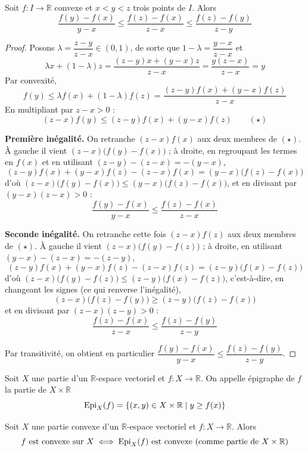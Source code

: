 \begin{prop}
Soit $f:I\to\mathbb{R}$ convexe et $x<y<z$ trois points de $I$. Alors
\[\frac{f(y)-f(x)}{y-x} \leq \frac{f(z)-f(x)}{z-x} \leq \frac{f(z)-f(y)}{z-y}\]
\end{prop}

\begin{proof}
Posons $\lambda = \dfrac{z-y}{z-x}\in(0,1)$, de sorte que $1-\lambda = \dfrac{y-x}{z-x}$ et
\[\lambda x+(1-\lambda)z = \frac{(z-y)x+(y-x)z}{z-x} = \frac{y(z-x)}{z-x} = y\]
Par convexité,
\[f(y) \leq \lambda f(x) + (1-\lambda) f(z) = \frac{(z-y)f(x)+(y-x)f(z)}{z-x}\]
En multipliant par $z-x>0$ :
\[(z-x)f(y) \leq (z-y)f(x)+(y-x)f(z) \qquad (\star)\]

\textbf{Première inégalité.} On retranche $(z-x)f(x)$ aux deux membres de $(\star)$. À gauche il vient $(z-x)\big(f(y)-f(x)\big)$ ; à droite, en regroupant les termes en $f(x)$ et en utilisant $(z-y)-(z-x)=-(y-x)$,
\[(z-y)f(x)+(y-x)f(z)-(z-x)f(x) = (y-x)\big(f(z)-f(x)\big)\]
d'où $(z-x)\big(f(y)-f(x)\big) \leq (y-x)\big(f(z)-f(x)\big)$, et en divisant par $(y-x)(z-x)>0$ :
\[\frac{f(y)-f(x)}{y-x} \leq \frac{f(z)-f(x)}{z-x}\]

\textbf{Seconde inégalité.} On retranche cette fois $(z-x)f(z)$ aux deux membres de $(\star)$. À gauche il vient $(z-x)\big(f(y)-f(z)\big)$ ; à droite, en utilisant $(y-x)-(z-x)=-(z-y)$,
\[(z-y)f(x)+(y-x)f(z)-(z-x)f(z) = (z-y)\big(f(x)-f(z)\big)\]
d'où $(z-x)\big(f(y)-f(z)\big) \leq (z-y)\big(f(x)-f(z)\big)$, c'est-à-dire, en changeant les signes (ce qui renverse l'inégalité),
\[(z-x)\big(f(z)-f(y)\big) \geq (z-y)\big(f(z)-f(x)\big)\]
et en divisant par $(z-x)(z-y)>0$ :
\[\frac{f(z)-f(x)}{z-x} \leq \frac{f(z)-f(y)}{z-y}\]

Par transitivité, on obtient en particulier $\dfrac{f(y)-f(x)}{y-x} \leq \dfrac{f(z)-f(y)}{z-y}$.
\end{proof}

\begin{defi}[Épigraphe]
Soit $X$ une partie d'un $\mathbb{R}$-espace vectoriel et $f:X\to\mathbb{R}$. On appelle épigraphe de $f$ la partie de $X\times\mathbb{R}$
\[\operatorname{Epi}_X(f) = \{(x,y)\in X\times\mathbb{R} \mid y\geq f(x)\}\]
\end{defi}

\begin{prop}
Soit $X$ une partie convexe d'un $\mathbb{R}$-espace vectoriel et $f:X\to\mathbb{R}$. Alors
\[f \text{ est convexe sur } X \iff \operatorname{Epi}_X(f) \text{ est convexe (comme partie de } X\times\mathbb{R})\]
\end{prop}

